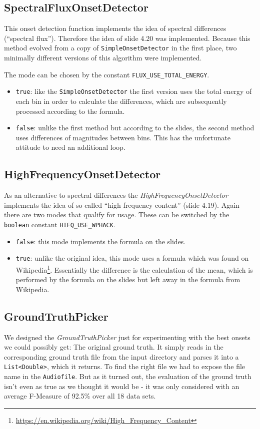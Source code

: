 \subsection{\ttfamily SpectralFluxOnsetDetector} \label{ssec:onsetflux}
This onset detection function implements the idea of spectral differences
(``spectral flux''). Therefore the idea of slide 4.20 was implemented. Because
this method evolved from a copy of \texttt{SimpleOnsetDetector} in the first
place, two minimally different versions of this algorithm were implemented.

The mode can be chosen by the constant \texttt{FLUX\_USE\_TOTAL\_ENERGY}.

\begin{itemize}
  \item \texttt{true}: like the \texttt{SimpleOnsetDetector} the first version
  uses the total energy of each bin in order to calculate the differences, which
  are subsequently processed according to the formula.
  \item \texttt{false}: unlike the first method but according to the slides, the
  second method uses differences of magnitudes between bins. This has the
  unfortunate attitude to need an additional loop.
\end{itemize}

\subsection{\ttfamily HighFrequencyOnsetDetector} \label{ssec:onsethighfreq}
As an alternative to spectral differences the \emph{HighFrequencyOnsetDetector}
implements the idea of so called ``high frequency content'' (slide 4.19). Again
there are two modes that qualify for usage. These can be switched by the
\texttt{boolean} constant \texttt{HIFQ\_USE\_WPHACK}.

\begin{itemize}
  \item \texttt{false}: this mode implements the formula on the slides.
  \item \texttt{true}: unlike the original idea, this mode uses a formula which
  was found on
  Wikipedia\footnote{\url{https://en.wikipedia.org/wiki/High_Frequency_Content}}.
  Essentially the difference is the calculation of the mean, which is performed
  by the formula on the slides but left away in the formula from Wikipedia.
\end{itemize}

\subsection{\ttfamily GroundTruthPicker} \label{ssec:onsetgroundtruth}
We designed the \emph{GroundTruthPicker} just for experimenting with the best
onsets we could possibly get: The original ground truth. It simply reads in the
corresponding ground truth file from the input directory and parses it into a
\texttt{List<Double>}, which it returns. To find the right file we had to expose
the file name in the \texttt{Audiofile}. But as it turned out, the evaluation of
the ground truth isn't even as true as we thought it would be - it was only
considered with an average F-Measure of 92.5\% over all 18 data sets.

